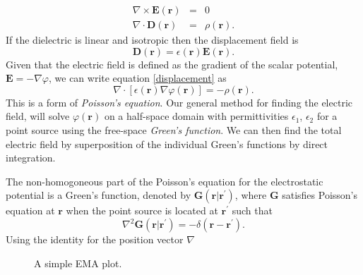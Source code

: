 \documentclass[a4paper, 12pt]{article}
\begin{document}
\begin{eqnarray}
\nabla \times \mathbf{E(r)}&=&0 \\
\nabla \cdot \mathbf{D(r)}&=&\rho(\mathbf{r}).
\end{eqnarray}
If the dielectric is linear and isotropic then the displacement field is 
\begin{equation}\label{displacement}
\mathbf{D(r)} = \epsilon(\mathbf{r})\mathbf{E}(\mathbf{r}).
\end{equation}
Given that the electric field is defined as the gradient of the scalar potential, $\mathbf{E}=-\nabla \varphi $, we can write equation \ref{displacement} as 
\begin{equation}
\nabla \cdot \left[\epsilon(\mathbf{r})\nabla \varphi (\mathbf{r}) \right] = -\rho (\mathbf{r}).
\end{equation}
This is a form of \emph{Poisson's equation}. Our general method for finding the electric field, will solve $\varphi (\mathbf{r})$ on a half-space domain with permittivities $\epsilon_1$, $\epsilon_2$ for a point source using the free-space \emph{Green's function}. We can then find the total electric field by superposition of the individual Green's functions by direct integration.

The non-homogoneous part of the Poisson's equation for the electrostatic potential is a Green's function, denoted by $\mathbf{G}(\mathbf{r} | \mathbf{r^\prime})$, where $\mathbf{G}$ satisfies Poisson's equation at $\mathbf{r}$ when the point source is located at $\mathbf{r^\prime}$ such that
\begin{equation}
\nabla^2 \mathbf{G}(\mathbf{r} | \mathbf{r^\prime}) = -\delta( \mathbf{r} - \mathbf{r^\prime}).
\end{equation}
Using the identity for the position vector $\nabla$

\begin{figure}[htb]
    \centering
    
    \caption{A simple EMA plot.\label{fig:E0}}
\end{figure}
\end{document}
